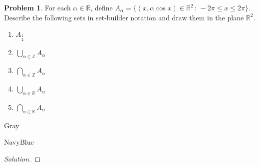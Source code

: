 \documentclass[12pt]{amsart}
\newcounter{problem_number}[section]
\theoremstyle{named}
\newenvironment{soln}
{\begin{color}{Gray}\begin{framed}\begin{color}{NavyBlue}\begin{proof}[Solution]
\doublespacing}
{\end{proof}\end{color}\end{framed}\end{color}}
\theoremstyle{definition}
\newtheorem{problem}{Problem}
\newcommand{\R}{\mathbb R}
\newcommand{\Z}{\mathbb Z}
\begin{document}
\begin{problem}
	For each $\alpha\in\R$, define $A_\alpha = \{(x,\alpha\cos x)\in\R^2\,:\, -2\pi\leq x\leq 2\pi\}$.
	Describe the following sets in set-builder notation and draw them in the plane $\R^2$.
	\begin{enumerate}
		\item $\displaystyle A_\frac{1}{2}$
		\item $\displaystyle\bigcup_{\alpha\in\Z} A_\alpha$
		\item $\displaystyle\bigcap_{\alpha\in\Z} A_\alpha$
		\item $\displaystyle\bigcup_{\alpha\in\R} A_\alpha$
		\item $\displaystyle\bigcap_{\alpha\in\R} A_\alpha$
	\end{enumerate}
\end{problem}

\begin{soln}
	
\end{soln}
\end{document}
